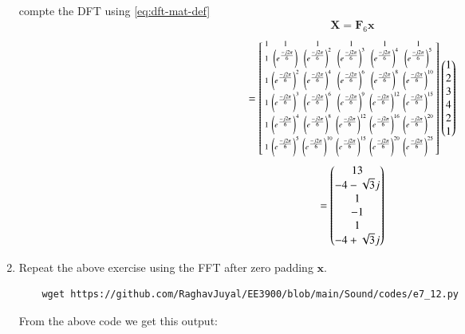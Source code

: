 \documentclass[journal,12pt,twocolumn]{IEEEtran}
\let\vec\mathbf
\renewcommand\thesection{\arabic{section}}
\begin{document}
\begin{enumerate}[label=\arabic*.,ref=\thesection.\theenumi]
\begin{align}
	\label{eq:equation1}
\end{align}
compte the DFT  
using 
\eqref{eq:dft-mat-def}\\
\solution
\begin{align}
	\vec{X} = \vec{F}_6 \vec{x}
\end{align}	
\begin{align}
	= \begin{bsmallmatrix}
		1	&	1	&	1	&	1	&	1	&	1\\
		1	&	\left(e^{\frac{-j2\pi}{6}}\right)	&	\left(e^{\frac{-j2\pi}{6}}\right)^2	&	\left(e^{\frac{-j2\pi}{6}}\right)^3	&	\left(e^{\frac{-j2\pi}{6}}\right)^4	&	\left(e^{\frac{-j2\pi}{6}}\right)^5\\
		1	&	\left(e^{\frac{-j2\pi}{6}}\right)^2	&	\left(e^{\frac{-j2\pi}{6}}\right)^4	&	\left(e^{\frac{-j2\pi}{6}}\right)^6	&	\left(e^{\frac{-j2\pi}{6}}\right)^8	&	\left(e^{\frac{-j2\pi}{6}}\right)^{10}\\
		1	&	\left(e^{\frac{-j2\pi}{6}}\right)^3	&	\left(e^{\frac{-j2\pi}{6}}\right)^6	&	\left(e^{\frac{-j2\pi}{6}}\right)^9	&	\left(e^{\frac{-j2\pi}{6}}\right)^{12}	&	\left(e^{\frac{-j2\pi}{6}}\right)^{15}\\
		1	&	\left(e^{\frac{-j2\pi}{6}}\right)^4	&	\left(e^{\frac{-j2\pi}{6}}\right)^8	&	\left(e^{\frac{-j2\pi}{6}}\right)^{12}	&	\left(e^{\frac{-j2\pi}{6}}\right)^{16}	&	\left(e^{\frac{-j2\pi}{6}}\right)^{20}\\
		1	&	\left(e^{\frac{-j2\pi}{6}}\right)^5	&	\left(e^{\frac{-j2\pi}{6}}\right)^{10}	&	\left(e^{\frac{-j2\pi}{6}}\right)^{15}	&	\left(e^{\frac{-j2\pi}{6}}\right)^{20}	&	\left(e^{\frac{-j2\pi}{6}}\right)^{25}
	\end{bsmallmatrix}
	\begin{pmatrix}1\\2\\3\\4\\2\\1\end{pmatrix}
\end{align}
\begin{align}
	=\begin{pmatrix}13\\-4 - \sqrt{3}j\\ 1\\-1\\1\\-4 + \sqrt{3}j\end{pmatrix}
\end{align}
\item Repeat the above exercise using the FFT
after zero padding $\vec{x}$.\\
\solution
\begin{lstlisting}
	wget https://github.com/RaghavJuyal/EE3900/blob/main/Sound/codes/e7_12.py
\end{lstlisting}
From the above code we get this output:

\end{enumerate}
\end{document}
